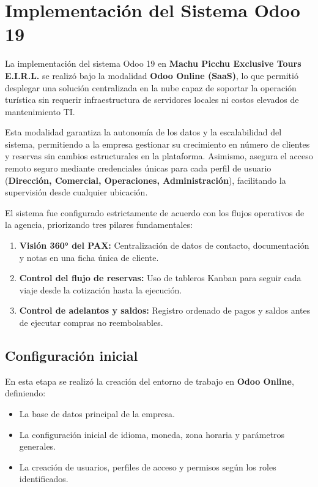 \section{Implementación del Sistema Odoo 19}

La implementación del sistema Odoo 19 en \textbf{Machu Picchu Exclusive Tours E.I.R.L.} se realizó bajo la modalidad \textbf{Odoo Online (SaaS)}, lo que permitió desplegar una solución centralizada en la nube capaz de soportar la operación turística sin requerir infraestructura de servidores locales ni costos elevados de mantenimiento TI.

Esta modalidad garantiza la autonomía de los datos y la escalabilidad del sistema, permitiendo a la empresa gestionar su crecimiento en número de clientes y reservas sin cambios estructurales en la plataforma. Asimismo, asegura el acceso remoto seguro mediante credenciales únicas para cada perfil de usuario (\textbf{Dirección, Comercial, Operaciones, Administración}), facilitando la supervisión desde cualquier ubicación.

El sistema fue configurado estrictamente de acuerdo con los flujos operativos de la agencia, priorizando tres pilares fundamentales:

\begin{enumerate}
    \item \textbf{Visión 360° del PAX:} Centralización de datos de contacto, documentación y notas en una ficha única de cliente.
    \item \textbf{Control del flujo de reservas:} Uso de tableros Kanban para seguir cada viaje desde la cotización hasta la ejecución.
    \item \textbf{Control de adelantos y saldos:} Registro ordenado de pagos y saldos antes de ejecutar compras no reembolsables.
\end{enumerate}

\subsection{Configuración inicial}

En esta etapa se realizó la creación del entorno de trabajo en \textbf{Odoo Online}, definiendo:

\begin{itemize}
    \item La base de datos principal de la empresa.
    \item La configuración inicial de idioma, moneda, zona horaria y parámetros generales.
    \item La creación de usuarios, perfiles de acceso y permisos según los roles identificados.
\end{itemize}

